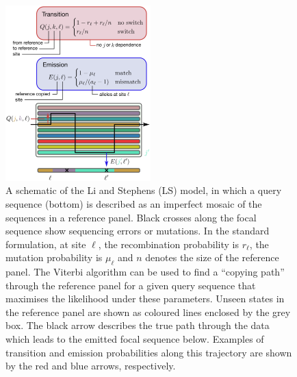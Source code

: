 \documentclass{article}
\begin{document}
\begin{figure} \centering
\includegraphics[width=0.5\textwidth]{figures/ls_diagram_covid.pdf}
\caption{\label{fig:ls_diagram} A schematic of the Li and Stephens (LS)
model, in which a query sequence (bottom) is described as an
imperfect mosaic of the sequences in a reference panel.
Black crosses along the focal sequence show sequencing
errors or mutations.
In the standard formulation, at site $\ell$, the recombination probability is $r_\ell$,
the mutation probability is $\mu_\ell$ and $n$
denotes the size of the reference panel.
The Viterbi algorithm can be used to find a
``copying path'' through the reference panel for a given query sequence that
maximises the likelihood under these parameters. Unseen states in the reference panel are shown as coloured lines enclosed by
the grey box. The black arrow describes the true path through the data which leads to the emitted
focal sequence below. Examples of transition and
emission probabilities along this trajectory are shown by the red and blue
arrows, respectively.
}
\end{figure}

%
%
\end{document}
